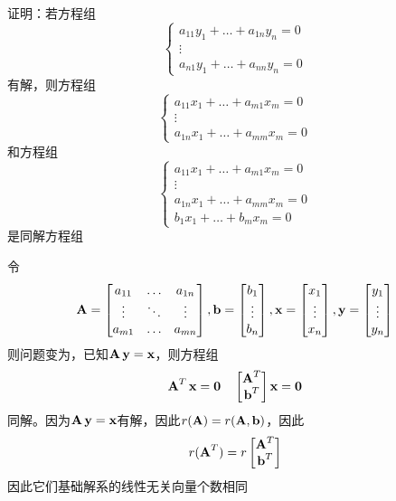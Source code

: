 \documentclass{article}
\begin{document}
\begin{examplle}[]
证明：若方程组
\begin{equation*}
\begin{cases}
a_{11}y_1+\dots+a_{1n}y_n=0\\
\vdots\\
a_{n1}y_1+\dots+a_{nn}y_n=0
\end{cases}
\end{equation*}
有解，则方程组
\begin{equation*}
\begin{cases}
a_{11}x_1+\dots+a_{m1}x_m=0\\
\vdots\\
a_{1n}x_1+\dots+a_{mm}x_m=0
\end{cases}
\end{equation*}
和方程组
\begin{equation*}
\begin{cases}
a_{11}x_1+\dots+a_{m1}x_m=0\\
\vdots\\
a_{1n}x_1+\dots+a_{mm}x_m=0\\
b_1x_1+\dots+b_mx_m=0
\end{cases}
\end{equation*}
是同解方程组

令
\begin{equation*}
\operatorname{\textbf{A}}=
\begin{bmatrix}
a_{11}&\dots&a_{1n}\\
\vdots&\ddots&\vdots\\
a_{m1}&\dots&a_{mn}\\
\end{bmatrix},
\operatorname{\textbf{b}}=
\begin{bmatrix}
b_1\\\vdots\\b_n
\end{bmatrix},
\operatorname{\textbf{x}}=
\begin{bmatrix}
x_1\\\vdots\\x_n
\end{bmatrix},
\operatorname{\textbf{y}}=
\begin{bmatrix}
y_1\\\vdots\\y_n
\end{bmatrix}
\end{equation*}
则问题变为，已知\(\operatorname{\textbf{A}}\operatorname{\textbf{y}}=\operatorname{\textbf{x}}\)，则方程组
\begin{equation*}
\operatorname{\textbf{A}}^T\operatorname{\textbf{x}}=\mathbf{0}\quad
\begin{bmatrix}
\operatorname{\textbf{A}}^T\\\operatorname{\textbf{b}}^T
\end{bmatrix}\operatorname{\textbf{x}}=\mathbf{0}
\end{equation*}
同解。因为\(\operatorname{\textbf{A}}\operatorname{\textbf{y}}=\operatorname{\textbf{x}}\)有解，因此\(r(\operatorname{\textbf{A}})=r(\operatorname{\textbf{A}},\operatorname{\textbf{b}})\)，因此
\begin{equation*}
r(\operatorname{\textbf{A}}^T)=r
\begin{bmatrix}
\operatorname{\textbf{A}}^T\\\operatorname{\textbf{b}}^T
\end{bmatrix}
\end{equation*}
因此它们基础解系的线性无关向量个数相同
\end{examplle}
\end{document}
